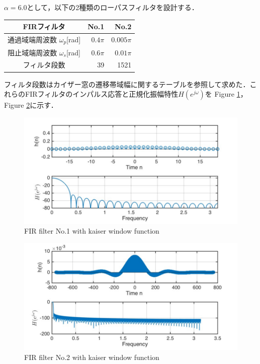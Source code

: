 \documentclass[twocolumn,oneside,a4paper]{article}
\begin{document}
$\alpha = 6.0$として，以下の2種類のローパスフィルタを設計する．

\begin{tabular}{crr}
\toprule
FIRフィルタ  & No.1 & No.2 \\
\midrule
通過域端周波数 $\omega_p$[rad] & $0.4 \pi$ & $0.005 \pi$ \\
阻止域端周波数 $\omega_s$[rad] & $0.6 \pi$ & $0.01 \pi$ \\
フィルタ段数 & 39 & 1521 \\
\bottomrule
\end{tabular}


フィルタ段数はカイザー窓の遷移帯域幅に関するテーブルを参照して求めた．これらのFIRフィルタのインパルス応答と正規化振幅特性$H(e^{j \omega})$を Figure \ref{eq:fir_window}，Figure \ref{eq:fir_window2}に示す．


\begin{figure}[htbp]
    \includegraphics[bb=0 0 432 216,width=1\columnwidth]{impulse_h.pdf}
    \caption{FIR filter No.1 with kaiser window function}
   \label{eq:fir_window}
\end{figure}

\begin{figure}[htbp]
    \includegraphics[bb=0 0 432 216,width=1\columnwidth]{impulse1521.pdf}
    \caption{FIR filter No.2 with kaiser window function}
   \label{eq:fir_window2}
\end{figure}
\end{document}
